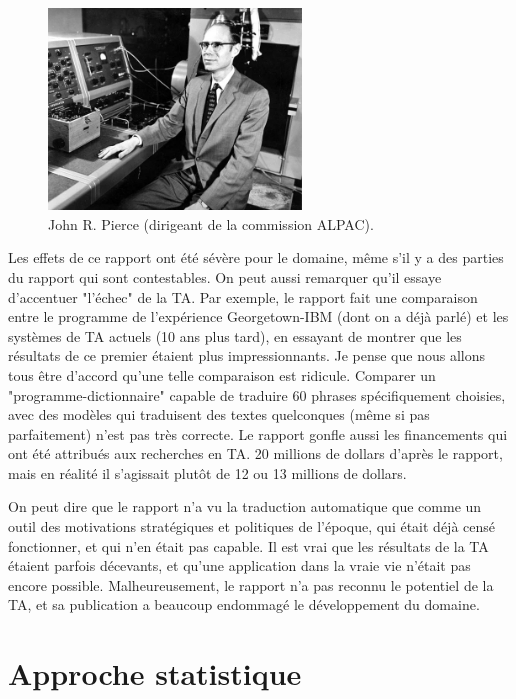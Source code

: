 \documentclass[11pt, a4paper]{report}
\begin{document}
  \begin{figure}[t]
    \centering
    \includegraphics[width=0.6\textwidth]{pierce.jpg}
    \caption{John R. Pierce (dirigeant de la commission ALPAC).}
    \label{fig:pierce}
  \end{figure}

  Les effets de ce rapport ont été sévère pour le domaine, même s'il y a des parties du rapport qui sont 
  contestables. On peut aussi remarquer qu'il essaye d'accentuer "l'échec" de la TA. 
  Par exemple, le rapport fait une comparaison entre le programme de l'expérience Georgetown-IBM 
  (dont on a déjà parlé) et les systèmes de TA actuels (10 ans plus tard), en essayant de montrer que les résultats 
  de ce premier étaient plus impressionnants. Je pense que nous allons tous être 
  d'accord qu'une telle comparaison est ridicule. Comparer un "programme-dictionnaire" capable 
  de traduire 60 phrases spécifiquement choisies, avec des modèles qui traduisent des textes 
  quelconques (même si pas parfaitement) n'est pas très correcte. Le rapport gonfle aussi les 
  financements qui ont été attribués aux recherches en TA. 20 millions de dollars d'après le rapport, mais en réalité 
  il s'agissait plutôt de 12 ou 13 millions de dollars. 
  
  On peut dire que le rapport n'a vu la traduction automatique que comme un outil des 
  motivations stratégiques et politiques de l'époque, qui était 
  déjà censé fonctionner, et qui n'en était pas capable. Il est vrai que les résultats 
  de la TA étaient parfois décevants, et qu'une application dans la vraie vie n'était pas encore possible. 
  Malheureusement, le rapport n'a pas reconnu le potentiel de la TA, et sa publication 
  a beaucoup endommagé le développement du domaine.   

  \section{Approche statistique}
\end{document}
